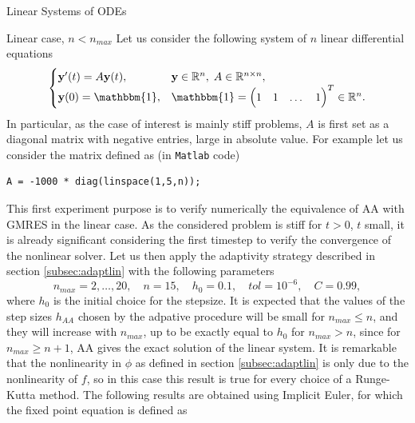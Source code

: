 \documentclass{article}
\begin{document}
\begin{section}{Linear Systems of ODEs}
\begin{subsection}{Linear case, $n < n_{max}$}\label{subsec:lin1}
Let us consider the following system of $n$ linear differential equations
\begin{equation}\label{eq:lin}
	\begin{cases}
		\textbf{y}'(t) = A\textbf{y}(t),& \textbf{y} \in \mathbb{R}^n, \; A \in \mathbb{R}^{n\times n},  \\
		\textbf{y}(0) = \mathbbm{1},	& \mathbbm{1} = \begin{pmatrix} 1 & 1 & \dots & 1 \end{pmatrix}^T \in \mathbb{R}^n.
	\end{cases}
\end{equation}
In particular, as the case of interest is mainly stiff problems, $A$ is first set as a diagonal matrix with negative entries, large in absolute value. For example let us consider the matrix defined as (in \texttt{Matlab} code)
\begin{verbatim}
A = -1000 * diag(linspace(1,5,n));
\end{verbatim}
This first experiment purpose is to verify numerically the equivalence of AA with GMRES in the linear case. As the considered problem is stiff for $t>0$, $t$ small, it is already significant considering the first timestep to verify the convergence of the nonlinear solver. Let us then apply the adaptivity strategy described in section \ref{subsec:adaptlin} with the following parameters
\begin{equation*}
	n_{max} = 2,\dots,20, \quad n = 15, \quad h_0 = 0.1, \quad tol = 10^{-6}, \quad C = 0.99,
\end{equation*}
where $h_0$ is the initial choice for the stepsize. It is expected that the values of the step sizes $h_{AA}$ chosen by the adpative procedure will be small for $n_{max}\leq n$, and they will increase with $n_{max}$, up to be exactly equal to $h_0$ for $n_{max} > n$, since for $n_{max} \geq n + 1$, AA gives the exact solution of the linear system. It is remarkable that the nonlinearity in $\phi$ as defined in section \ref{subsec:adaptlin} is only due to the nonlinearity of $f$, so in this case this result is true for every choice of a Runge-Kutta method. The following results are obtained using Implicit Euler, for which the fixed point equation is defined as
\begin{equation}\label{eq:fpIE}

\end{equation}
\end{subsection}
\end{section}
\end{document}
